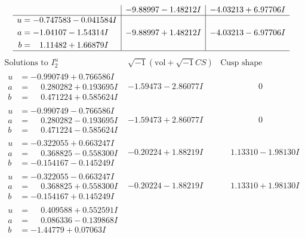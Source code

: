 \documentclass[1p]{elsarticle_modified}
\theoremstyle{definition}
\newcommand{\I}{\sqrt{-1}}
\begin{document}
$$\begin{array}{c|c|c}
 & -9.88997 - 1.48212 I & -4.03213 + 6.97706 I \\ \hline\begin{aligned}
u &= -0.747583 - 0.041584 I \\
a &= -1.04107 - 1.54314 I \\
b &= \phantom{-}1.11482 + 1.66879 I\end{aligned}
 & -9.88997 + 1.48212 I & -4.03213 - 6.97706 I\\
 \hline 
 \end{array}$$\newpage$$\begin{array}{c|c|c}  
\text{Solutions to }I^u_{2}& \I (\text{vol} + \sqrt{-1}CS) & \text{Cusp shape}\\
 \hline 
\begin{aligned}
u &= -0.990749 + 0.766586 I \\
a &= \phantom{-}0.280282 + 0.193695 I \\
b &= \phantom{-}0.471224 + 0.585624 I\end{aligned}
 & -1.59473 - 2.86077 I & \phantom{-0.000000 } 0 \\ \hline\begin{aligned}
u &= -0.990749 - 0.766586 I \\
a &= \phantom{-}0.280282 - 0.193695 I \\
b &= \phantom{-}0.471224 - 0.585624 I\end{aligned}
 & -1.59473 + 2.86077 I & \phantom{-0.000000 } 0 \\ \hline\begin{aligned}
u &= -0.322055 + 0.663247 I \\
a &= \phantom{-}0.368825 - 0.558300 I \\
b &= -0.154167 - 0.145249 I\end{aligned}
 & -0.20224 + 1.88219 I & \phantom{-}1.13310 - 1.98130 I \\ \hline\begin{aligned}
u &= -0.322055 - 0.663247 I \\
a &= \phantom{-}0.368825 + 0.558300 I \\
b &= -0.154167 + 0.145249 I\end{aligned}
 & -0.20224 - 1.88219 I & \phantom{-}1.13310 + 1.98130 I \\ \hline\begin{aligned}
u &= \phantom{-}0.409588 + 0.552591 I \\
a &= \phantom{-}0.086336 - 0.139868 I \\
b &= -1.44779 + 0.07063 I\end{aligned}

\end{array}$$
\end{document}
